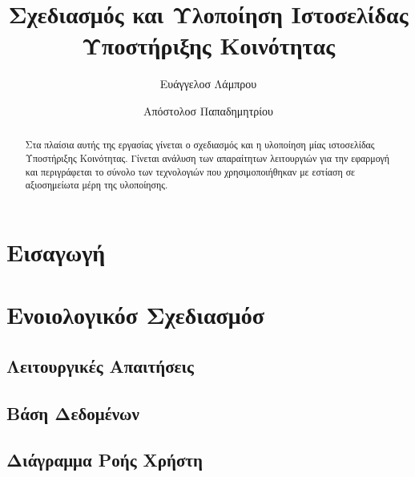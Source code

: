 \documentclass[acmtog, nonacm, language=english, language=greek]{acmart}
\begin{document}
\title{Σχεδιασμός και Υλοποίηση Ιστοσελίδας Υποστήριξης Κοινότητας}

\author{Ευάγγελοσ Λάμπρου}
\orcid{}

\author{Απόστολοσ Παπαδημητρίου}

\begin{abstract}
    Στα πλαίσια αυτής της εργασίας γίνεται ο σχεδιασμός και η υλοποίηση μίας 
    ιστοσελίδας Υποστήριξης Κοινότητας. Γίνεται ανάλυση των απαραίτητων 
    λειτουργιών για την εφαρμογή και περιγράφεται το σύνολο των τεχνολογιών 
    που χρησιμοποιήθηκαν με εστίαση σε αξιοσημείωτα μέρη της υλοποίησης.
\end{abstract}

\maketitle

\section{Εισαγωγή}

\section{Ενοιολογικόσ Σχεδιασμόσ}

\subsection{Λειτουργικές Απαιτήσεις}
\subsection{Βάση Δεδομένων}
\subsection{Διάγραμμα Ροής Χρήστη}
\end{document}
